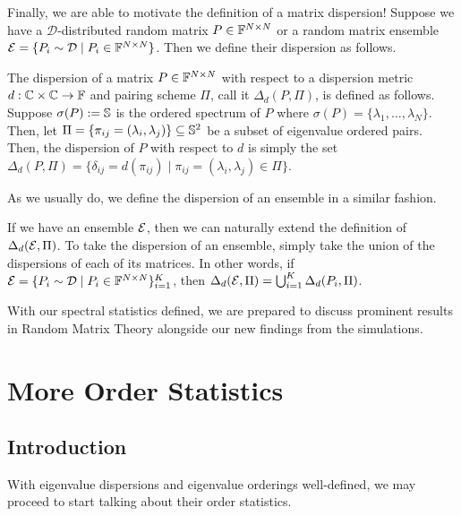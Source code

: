 Finally, we are able to motivate the definition of a matrix dispersion! Suppose we have a $\mathcal{D}$-distributed random matrix $P \in \F^{N \times N}$ or a random matrix ensemble $\Ens = \{P_i \sim \mathcal{D} \mid P_i \in \F^{N \times N}\}$. Then we define their dispersion as follows. 

\begin{definition}[Dispersion]
The dispersion of a matrix $P \in \F^{N \times N}$ with respect to a dispersion metric $d: \Cc \times \Cc \to \F$ and pairing scheme $\Pi$, call it $\Delta_d(P, \Pi)$, is defined as follows. Suppose $\sigma(P) := \S$ is the ordered spectrum of $P$ where $\sigma(P) = \{\lambda_1, \dots, \lambda_N\}$. Then, let $\Pi = \{\pi_{ij} = (\lambda_i,\lambda_j) \} \subseteq \S^2$ be a subset of eigenvalue ordered pairs. Then, the dispersion of $P$ with respect to $d$ is simply the set $\Delta_d(P, \Pi)=\{\delta_{ij} = d(\pi_{ij}) \mid \pi_{ij} = (\lambda_i,\lambda_j) \in \Pi\}$.
\end{definition}

As we usually do, we define the dispersion of an ensemble in a similar fashion. 

\begin{definition}
If we have an ensemble $\Ens$, then we can naturally extend the definition of $\Delta_d(\Ens, \Pi)$. To take the dispersion of an ensemble, simply take the union of the dispersions of each of its matrices. In other words, if $\Ens = \{P_i \sim \mathcal{D} \mid P_i \in \F^{N \times N}\}_{i = 1}^K$, then $\Delta_d(\Ens, \Pi) = \bigcup_{i=1}^K \Delta_d(P_i, \Pi)$.
\end{definition}

With our spectral statistics defined, we are prepared to discuss prominent results in Random Matrix Theory alongside our new findings from the simulations. 


\section{More Order Statistics}
\subsection{Introduction}
With eigenvalue dispersions and eigenvalue orderings well-defined, we may proceed to start talking about their order statistics. 

